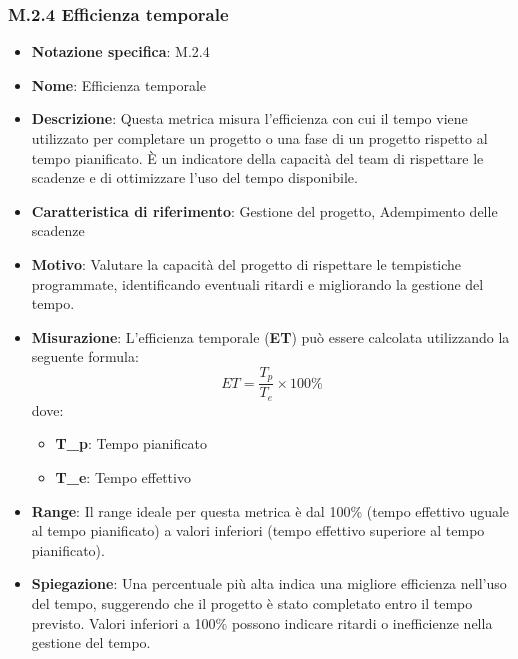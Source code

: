 \subsubsection{M.2.4 Efficienza temporale}
\begin{itemize}
    \item \textbf{Notazione specifica}: M.2.4
    \item \textbf{Nome}: Efficienza temporale
    \item \textbf{Descrizione}: Questa metrica misura l'efficienza con cui il tempo viene utilizzato per completare un progetto o una fase di un progetto rispetto al tempo pianificato. È un indicatore della capacità del team di rispettare le scadenze e di ottimizzare l'uso del tempo disponibile.
    \item \textbf{Caratteristica di riferimento}: Gestione del progetto, Adempimento delle scadenze
    \item \textbf{Motivo}: Valutare la capacità del progetto di rispettare le tempistiche programmate, identificando eventuali ritardi e migliorando la gestione del tempo.
    \item \textbf{Misurazione}: L'efficienza temporale (\textbf{ET}) può essere calcolata utilizzando la seguente formula:
    \[ ET = \frac{T_p}{T_e} \times 100\% \]
    dove:
    \begin{itemize}
        \item \textbf{T_p}: Tempo pianificato
        \item \textbf{T_e}: Tempo effettivo
    \end{itemize}
    \item \textbf{Range}: Il range ideale per questa metrica è dal 100\% (tempo effettivo uguale al tempo pianificato) a valori inferiori (tempo effettivo superiore al tempo pianificato).
    \item \textbf{Spiegazione}: Una percentuale più alta indica una migliore efficienza nell'uso del tempo, suggerendo che il progetto è stato completato entro il tempo previsto. Valori inferiori a 100\% possono indicare ritardi o inefficienze nella gestione del tempo.
\end{itemize}
